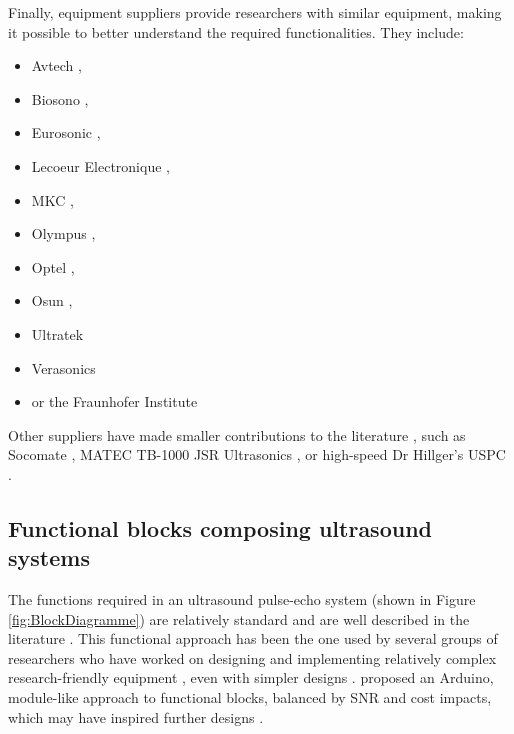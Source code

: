 \documentclass{article}
\begin{document}
Finally, equipment suppliers provide researchers with similar equipment, making it possible to better understand the required functionalities. They include:
\begin{itemize}

\item Avtech \cite{qiu_high-resolution_2020,lei_high-frame_nodate},
\item Biosono \cite{biosono_sonolab_nodate,bharath_fpga-based_2015},
\item Eurosonic \cite{jin_optimization_2017, mostavi_application_2017, ranachowski_mechanical_2020, vadalma_smartphone_2020}, 
\item Lecoeur Electronique \cite{lecoeur_bluetooth_nodate, tortoli_ula-op:_2009, zhang_toward_2018, al-aufi_thin_2019},
\item MKC \cite{park_ultrasound_2019-1},
\item Olympus \cite{veenstra_generating_nodate,choi_versatile_2020,chun_ultrasound_2015,xu_low-cost_2007},
\item Optel \cite{ scholle_pulse_2018, ratajski_application_2017, nowak_evaluation_2020, karjalainen_multi-site_2012},
\item Osun \cite{vadalma_smartphone_2020,bharath_fpga-based_2015}, 
\item Ultratek \cite{veenstra_generating_nodate, perez-sanchez_numerical_2020, chen_ultrasound_2016, wang_preliminary_2019}
\item
Verasonics \cite{peyton_front-end_2017, george_portable_2018, kang_new_2017, hager_ultralight:_2017} 
\item or  the Fraunhofer Institute \cite{zimmermann_highly_2019, zimmermann_miniaturized_2018, zimmermann_high_2018} 
\end{itemize}

Other suppliers have made smaller contributions to the literature \cite{ozdemir_remote_2018}, such as Socomate \cite{gil-alba_morphological_2019}, MATEC TB-1000 \cite{kielczynski_thermophysical_2017} JSR Ultrasonics \cite{cramer_ultrasonic_2015}, or high-speed Dr Hillger's USPC \cite{hillger_high_2016}. 


\subsection{Functional blocks composing ultrasound systems}

The functions required in an ultrasound pulse-echo system (shown in Figure \ref{fig:BlockDiagramme}) are relatively standard and are well described in the literature \cite{murtaza_ali_signal_2008}. This functional approach has been the one used by several groups of researchers who have worked on designing and implementing relatively complex research-friendly equipment \cite{boni_ula-op_2016, boni_reconfigurable_2012, boni_ultrasound_2018, qiu_flexible_2012, levesque_architecture_2011}, even with simpler designs  \cite{carotenuto_fast_2005,richard_low-cost_2008,taylor_development_2017}. \cite{jonveaux_arduino-like_2017} proposed an Arduino, module-like approach to functional blocks, balanced by SNR and cost impacts, which may have inspired further designs \cite{golabek_construction_2019}.
\end{document}
